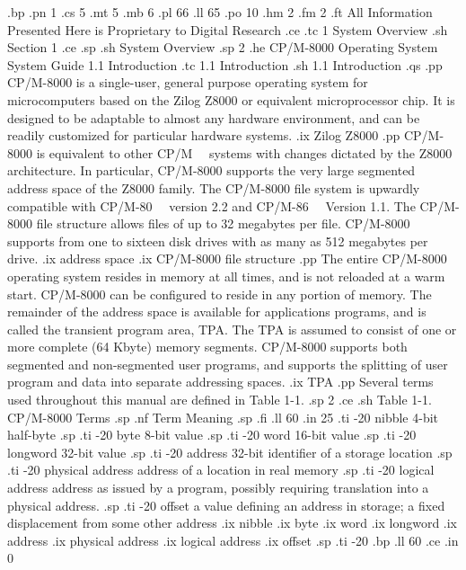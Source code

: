 .bp
.pn 1  
.cs 5
.mt 5
.mb 6
.pl 66
.ll 65
.po 10
.hm 2
.fm 2
.ft All Information Presented Here is Proprietary to Digital Research
.ce
.tc 1  System Overview 
.sh
Section 1 
.ce
.sp
.sh
System Overview 
.sp 2
.he CP/M-8000 Operating System System Guide           1.1  Introduction
.tc    1.1  Introduction
.sh
1.1  Introduction
.qs
.pp
CP/M-8000 is a single-user, general purpose operating system for
microcomputers based on the Zilog Z8000 or equivalent microprocessor 
chip.  It is designed to be adaptable to almost any hardware environment, and 
can be readily customized for particular hardware systems.
.ix Zilog Z8000
.pp
CP/M-8000 is equivalent to other CP/M \ \ systems with changes
dictated by the Z8000 architecture.  In particular, CP/M-8000 supports the
very large segmented address space of the Z8000 family.  
The CP/M-8000 file system
is upwardly compatible with CP/M-80 \ \ version 2.2 and CP/M-86 \ \ Version 
1.1.  The CP/M-8000 file structure allows files of up to 32 megabytes per 
file.   CP/M-8000 supports from one to sixteen disk drives with as many as 
512 megabytes per drive.
.ix address space
.ix CP/M-8000 file structure
.pp
The entire CP/M-8000 operating system resides in memory at all times,
and is not reloaded at a warm start.  CP/M-8000 can be configured to reside in 
any portion of memory.
The remainder of the address space is available for applications programs, 
and is called the transient program area, TPA.  
The TPA is assumed to consist of one or more complete (64 Kbyte) 
memory segments.
CP/M-8000 supports both segmented and non-segmented user programs, and
supports the splitting of user program and data into separate addressing
spaces.
.ix TPA
.pp
Several terms used throughout this manual are defined in Table 1-1.
.sp 2
.ce
.sh
Table 1-1.   CP/M-8000 Terms
.sp
.nf
       Term                            Meaning               
.sp
.fi
.ll 60
.in 25
.ti -20
nibble              4-bit half-byte
.sp
.ti -20
byte                8-bit value
.sp
.ti -20
word                16-bit value
.sp
.ti -20
longword            32-bit value
.sp
.ti -20
address             32-bit identifier of a storage location
.sp
.ti -20
physical address    address of a location in real memory
.sp
.ti -20
logical address     address as issued by a program, possibly requiring
translation into a physical address.
.sp
.ti -20
offset              a value defining an address in storage; a fixed 
displacement from some other address
.ix nibble
.ix byte
.ix word
.ix longword
.ix address
.ix physical address
.ix logical address
.ix offset
.sp
.ti -20
.bp
.ll 60
.ce
.in 0

